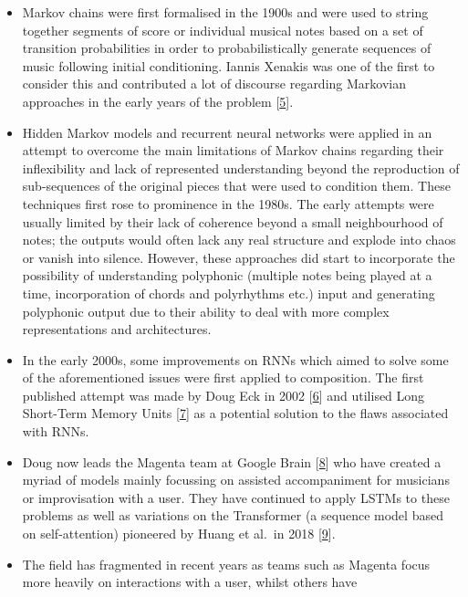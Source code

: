 \documentclass[12pt,]{article}
\providecommand{\tightlist}{%
  \setlength{\itemsep}{0pt}\setlength{\parskip}{0pt}}
\begin{document}
\begin{itemize}
\tightlist
\item
  Markov chains were first formalised in the 1900s and were used to
  string together segments of score or individual musical notes based on
  a set of transition probabilities in order to probabilistically
  generate sequences of music following initial conditioning. Iannis
  Xenakis was one of the first to consider this and contributed a lot of
  discourse regarding Markovian approaches in the early years of the
  problem {[}\protect\hyperlink{ref-luque2009stochastic}{5}{]}.
\item
  Hidden Markov models and recurrent neural networks were applied in an
  attempt to overcome the main limitations of Markov chains regarding
  their inflexibility and lack of represented understanding beyond the
  reproduction of sub-sequences of the original pieces that were used to
  condition them. These techniques first rose to prominence in the
  1980s. The early attempts were usually limited by their lack of
  coherence beyond a small neighbourhood of notes; the outputs would
  often lack any real structure and explode into chaos or vanish into
  silence. However, these approaches did start to incorporate the
  possibility of understanding polyphonic (multiple notes being played
  at a time, incorporation of chords and polyrhythms etc.) input and
  generating polyphonic output due to their ability to deal with more
  complex representations and architectures.
\item
  In the early 2000s, some improvements on RNNs which aimed to solve
  some of the aforementioned issues were first applied to composition.
  The first published attempt was made by Doug Eck in 2002
  {[}\protect\hyperlink{ref-eck2002finding}{6}{]} and utilised Long
  Short-Term Memory Units
  {[}\protect\hyperlink{ref-gers1999learning}{7}{]} as a potential
  solution to the flaws associated with RNNs.
\item
  Doug now leads the Magenta team at Google Brain
  {[}\protect\hyperlink{ref-magenta}{8}{]} who have created a myriad of
  models mainly focussing on assisted accompaniment for musicians or
  improvisation with a user. They have continued to apply LSTMs to these
  problems as well as variations on the Transformer (a sequence model
  based on self-attention) pioneered by Huang et al.~in 2018
  {[}\protect\hyperlink{ref-huang2018improved}{9}{]}.
\item
  The field has fragmented in recent years as teams such as Magenta
  focus more heavily on interactions with a user, whilst others have

\end{itemize}
\end{document}
